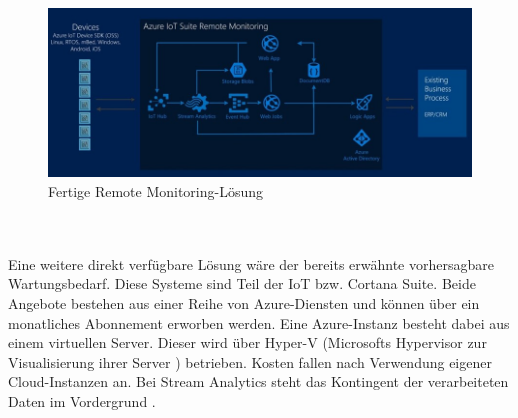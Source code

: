 \begin{figure}[ht!]
	\centering
	\includegraphics[width=1.0\linewidth]{images/remote_monitor}
	\caption{Fertige Remote Monitoring-Lösung \cite{Azure.2017}} %
	\label{fig:remote_monitor}
\end{figure}
\\ \\Eine weitere direkt verfügbare Lösung wäre der bereits erwähnte vorhersagbare Wartungsbedarf. Diese Systeme sind Teil der IoT bzw. Cortana Suite. Beide Angebote bestehen aus einer Reihe von Azure-Diensten und können über ein monatliches Abonnement erworben werden.   
Eine Azure-Instanz besteht dabei aus einem virtuellen Server. Dieser wird über Hyper-V (Microsofts Hypervisor zur Visualisierung ihrer Server \cite{searchdatacenter.2017}) betrieben. Kosten fallen nach Verwendung eigener Cloud-Instanzen an. Bei Stream Analytics steht das Kontingent der verarbeiteten Daten im Vordergrund \cite{PeterTsai.2016}.  
